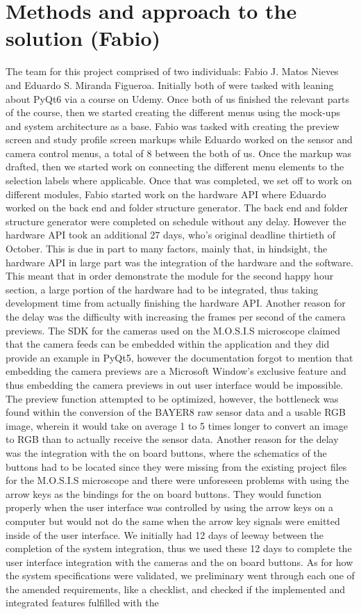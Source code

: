 \section{Methods and approach to the solution (Fabio)}
The team for this project comprised of two individuals: Fabio J. Matos Nieves and Eduardo S. Miranda Figueroa. Initially both of were tasked with leaning about PyQt6 via a course on Udemy. Once both of us finished the relevant parts of the course, then we started creating the different menus using the mock-ups and system architecture as a base. Fabio was tasked with creating the preview screen and study profile screen markups while Eduardo worked on the sensor and camera control menus, a total of 8 between the both of us. Once the markup was drafted, then we started work on connecting the different menu elements to the selection labels where applicable. Once that was completed, we set off to work on different modules, Fabio started work on the hardware API where Eduardo worked on the back end and folder structure generator. The back end and folder structure generator were completed on schedule without any delay. However the hardware API took an additional 27 days, who's original deadline thirtieth of October. This is due in part to many factors, mainly that, in hindsight, the hardware API in large part was the integration of the hardware and the software. This meant that in order demonstrate the module for the second happy hour section, a large portion of the hardware had to be integrated, thus taking development time from actually finishing the hardware API. Another reason for the delay was the difficulty with increasing the frames per second of the camera previews. The SDK for the cameras used on the M.O.S.I.S microscope claimed that the camera feeds can be embedded within the application and they did provide an example in PyQt5, however the documentation forgot to mention that embedding the camera previews are a Microsoft Window's exclusive feature and thus embedding the camera previews in out user interface would be impossible. The preview function attempted to be optimized, however, the bottleneck was found within the conversion of the BAYER8 raw sensor data and a usable RGB image, wherein it would take on average 1 to 5 times longer to convert an image to RGB than to actually receive the sensor data. Another reason for the delay was the integration with the on board buttons, where the schematics of the buttons had to be located since they were missing from the existing project files for the M.O.S.I.S microscope and there were unforeseen problems with using the arrow keys as the bindings for the on board buttons. They would function properly when the user interface was controlled by using the arrow keys on a computer but would not do the same when the arrow key signals were emitted inside of the user interface. We initially had 12 days of leeway between the completion of the system integration, thus we used these 12 days to complete the user interface integration with the cameras and the on board buttons. As for how the system specifications were validated, we preliminary went through each one of the amended requirements, like a checklist, and checked if the implemented and integrated features fulfilled with the 